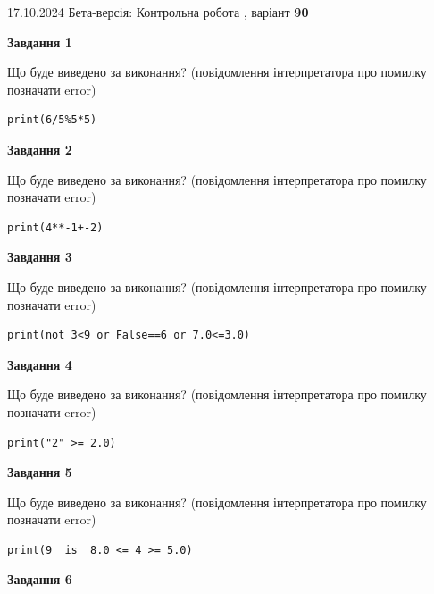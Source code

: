 \documentclass[12pt, ukrainian]{article}
\begin{document}
{\Large{17.10.2024 Бета-версія: Контрольна робота , варіант  \No \textbf { 90 }\par}}
{
\begin {large}
{\begin {center}\textbf{Завдання 1}\end {center}}

Що буде виведено за виконання? (повідомлення інтерпретатора про помилку позначати error)\par
\begin{verbatim}
print(6/5%5*5)
\end{verbatim}

{\begin {center}\textbf{Завдання 2}\end {center}}

Що буде виведено за виконання? (повідомлення інтерпретатора про помилку позначати error)\par
\begin{verbatim}
print(4**-1+-2)
\end{verbatim}

{\begin {center}\textbf{Завдання 3}\end {center}}

Що буде виведено за виконання? (повідомлення інтерпретатора про помилку позначати error)\par
\begin{verbatim}
print(not 3<9 or False==6 or 7.0<=3.0)
\end{verbatim}

{\begin {center}\textbf{Завдання 4}\end {center}}

Що буде виведено за виконання? (повідомлення інтерпретатора про помилку позначати error)\par
\begin{verbatim}
print("2" >= 2.0)
\end{verbatim}

{\begin {center}\textbf{Завдання 5}\end {center}}

Що буде виведено за виконання? (повідомлення інтерпретатора про помилку позначати error)\par
\begin{verbatim}
print(9  is  8.0 <= 4 >= 5.0)
\end{verbatim}

{\begin {center}\textbf{Завдання 6}\end {center}}


\end{large}}
\end{document}
